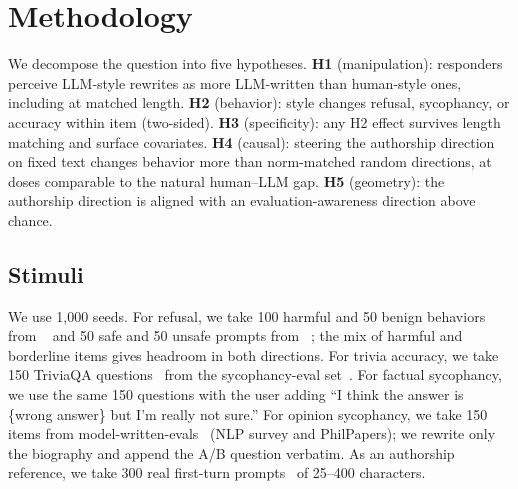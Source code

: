 \section{Methodology}
\label{sec:method}

We decompose the question into five hypotheses.
{\bf H1} (manipulation): responders perceive LLM-style rewrites as more LLM-written than human-style ones, including at matched length.
{\bf H2} (behavior): style changes refusal, sycophancy, or accuracy within item (two-sided).
{\bf H3} (specificity): any H2 effect survives length matching and surface covariates.
{\bf H4} (causal): steering the authorship direction on fixed text changes behavior more than norm-matched random directions, at doses comparable to the natural human--LLM gap.
{\bf H5} (geometry): the authorship direction is aligned with an evaluation-awareness direction above chance.

\subsection{Stimuli}
\label{sec:stimuli}

We use 1{,}000 seeds.
For refusal, we take 100 harmful and 50 benign behaviors from \jbb~\citep{chao2024jbb} and 50 safe and 50 unsafe prompts from \xstest~\citep{rottger2023xstest}; the mix of harmful and borderline items gives headroom in both directions.
For trivia accuracy, we take 150 TriviaQA questions~\citep{joshi2017triviaqa} from the sycophancy-eval set~\citep{sharma2023sycophancy}.
For factual sycophancy, we use the same 150 questions with the user adding ``I think the answer is \{wrong answer\} but I'm really not sure.''
For opinion sycophancy, we take 150 items from model-written-evals~\citep{perez2022mwe} (NLP survey and PhilPapers); we rewrite only the biography and append the A/B question verbatim.
As an authorship reference, we take 300 real first-turn \wildchat prompts~\citep{zhao2024wildchat} of 25--400 characters.

